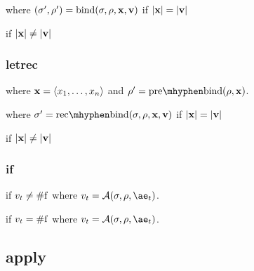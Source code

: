 \documentclass{sigplanconf}
\begin{document}

\noindent
where $(\sigma',\rho')=\mathrm{bind}(\sigma,\rho,\mathbf{x},\mathbf{v})$ if $|\mathbf{x}|=|\mathbf{v}|$

 if $|\mathbf{x}|\ne|\mathbf{v}|$

\subsubsection{letrec}

\noindent
{}

\noindent
where $\mathbf{x}=\langle x_1,\dots,x_n\rangle$ and $\rho'=\prebind{\rho}{\vx}$.


\noindent
where $\sigma'=\recbind{\sigma}{\rho}{\vx}{\vv}$ if $|\mathbf{x}|=|\mathbf{v}|$

 if $|\mathbf{x}|\ne|\mathbf{v}|$

\subsubsection{if}

if $v_t\ne\mathrm{\#f}$
where $v_t=\A{\sigma}{\rho}{\ae_t}$.

if $v_t=\mathrm{\#f}$
where $v_t=\A{\sigma}{\rho}{\ae_t}$.





\subsection{apply}
\end{document}
